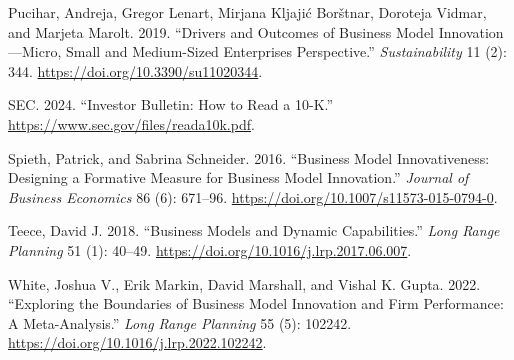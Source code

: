 \documentclass[
]{article}
\newlength{\cslhangindent}
\newenvironment{CSLReferences}[2] %
 {\begin{list}{}{%
  \setlength{\itemindent}{0pt}
  \setlength{\leftmargin}{0pt}
  \setlength{\parsep}{0pt}
  \ifodd #1
   \setlength{\leftmargin}{\cslhangindent}
   \setlength{\itemindent}{-1\cslhangindent}
  \fi
  \setlength{\itemsep}{#2\baselineskip}}}
 {\end{list}}
\begin{document}
\begin{CSLReferences}{1}{0}
Pucihar, Andreja, Gregor Lenart, Mirjana Kljajić Borštnar, Doroteja
Vidmar, and Marjeta Marolt. 2019. {``Drivers and {Outcomes} of
{Business} {Model} {Innovation}---{Micro}, {Small} and {Medium}-{Sized}
{Enterprises} {Perspective}.''} \emph{Sustainability} 11 (2): 344.
\url{https://doi.org/10.3390/su11020344}.

SEC. 2024. {``Investor {Bulletin}: {How} to {Read} a 10-{K}.''}
\url{https://www.sec.gov/files/reada10k.pdf}.

Spieth, Patrick, and Sabrina Schneider. 2016. {``Business Model
Innovativeness: Designing a Formative Measure for Business Model
Innovation.''} \emph{Journal of Business Economics} 86 (6): 671--96.
\url{https://doi.org/10.1007/s11573-015-0794-0}.

Teece, David J. 2018. {``Business Models and Dynamic Capabilities.''}
\emph{Long Range Planning} 51 (1): 40--49.
\url{https://doi.org/10.1016/j.lrp.2017.06.007}.

White, Joshua V., Erik Markin, David Marshall, and Vishal K. Gupta.
2022. {``Exploring the Boundaries of Business Model Innovation and Firm
Performance: {A} Meta-Analysis.''} \emph{Long Range Planning} 55 (5):
102242. \url{https://doi.org/10.1016/j.lrp.2022.102242}.

\end{CSLReferences}
\end{document}
